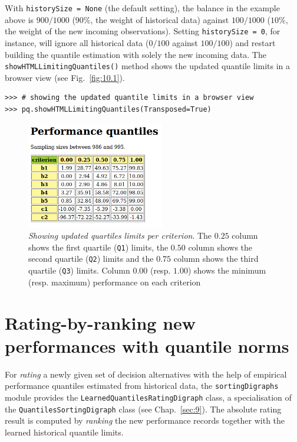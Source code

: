 With \texttt{historySize = None} (the default setting), the balance in the example above is $900/1000$ ($90\%$, the weight of historical data) against $100/1000$ ($10\%$, the weight of the new incoming observations). Setting \texttt{historySize = 0}, for instance, will ignore all historical data ($0/100$ against $100/100$) and restart building the quantile estimation with solely the new incoming data. The \texttt{showHTMLLimitingQuantiles()} method shows the updated quantile limits in a browser view (see Fig.~\vref{fig:10.1}).
\begin{lstlisting}
>>> # showing the updated quantile limits in a browser view
>>> pq.showHTMLLimitingQuantiles(Transposed=True)
\end{lstlisting}
\begin{figure}[ht]
\sidecaption[t]
\includegraphics[width=6cm]{Figures/10-1-examplePerfQuantiles.png}
\caption[Showing updated quartiles limits per criterion]{\emph{Showing updated quartiles limits per criterion}. The $0.25$ column shows the first quartile (\texttt{Q1}) limits, the $0.50$ column shows the second quartile (\texttt{Q2}) limits and the $0.75$ column shows the third quartile (\texttt{Q3}) limits. Column $0.00$ (resp. $1.00$) shows the minimum (resp. maximum) performance on each criterion}
\label{fig:10.1}       %
\end{figure}
    
\section{Rating-by-ranking new performances with quantile norms}
\label{sec:10.3}

For \emph{rating} a newly given set of decision alternatives with the help of empirical performance quantiles estimated from historical data, the \texttt{sortingDigraphs} module provides the \texttt{Learned\-QuantilesRatingDigraph} class, a specialisation of the \texttt{QuantilesSor\-tingDigraph} class (see Chap.~\ref{sec:9}). The absolute rating result is computed by \emph{ranking} the new performance records together with the learned historical quantile limits.

